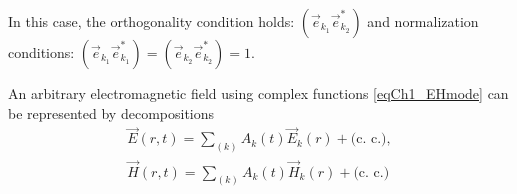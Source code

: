 In this case, the orthogonality condition holds:
$\left(\vec{e}_{k_1} \vec{e}_{k_2}^{*}\right)$
and normalization conditions:
$\left(\vec{e}_{k_1} \vec{e}_{k_1}^{*}\right) = \left(\vec{e}_{k_2}
\vec{e}_{k_2}^{*}\right) = 1$.

An arbitrary electromagnetic field using complex functions 
\eqref{eqCh1_EHmode} can be represented by decompositions 
\begin{eqnarray}
\vec{E}\left(r, t\right) = 
\sum_{(k)} 
A_k\left(t\right) \vec{E}_k\left(r\right) + \text{(c. c.)},
\nonumber \\
\vec{H}\left(r, t\right) = 
\sum_{(k)} 
A_k\left(t\right) \vec{H}_k\left(r\right) +
\text{(c. c.)}
\end{eqnarray}